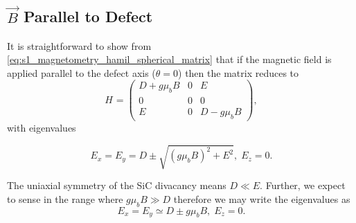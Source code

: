 \subsection{$\vec{B}$ Parallel to Defect}
It is straightforward to show from \eqref{eq:s1_magnetometry_hamil_spherical_matrix} that if the magnetic field is applied parallel to the defect axis ($\theta = 0$) then the matrix reduces to
\begin{equation}
	H_{} = \begin{pmatrix}
		D + g\mu_b B & 0 & E          \\
		0            & 0 & 0          \\
		E            & 0 & D-g\mu_b B
	\end{pmatrix},
	\label{eq:reduced_H_s1_magnetometry_matrix}
\end{equation}
with eigenvalues

\begin{equation}
	E_x = E_y = D \pm \sqrt{(g\mu_b B)^2  + E^2}, \; E_z = 0.
	\label{eq:reduced_H_NV_eigenvalues}
\end{equation}

The uniaxial symmetry of the SiC divacancy means $D \ll E$. Further, we expect to sense in the range where $g\mu_b B \gg D$ therefore we may write the eigenvalues as
\begin{equation}
	E_x = E_y \simeq D \pm g\mu_b B, \; E_z = 0.
	\label{eq:reduced_H_NV_eigenvalues}
\end{equation}

